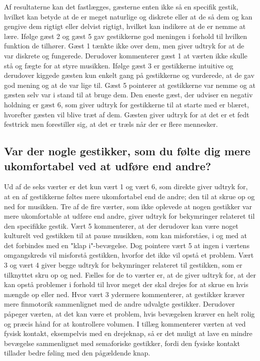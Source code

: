 Af resultaterne kan det fastlægges, gæsterne enten ikke så en specifik gestik, hvilket kan betyde at de er meget naturlige og diskrete eller at de så dem og kan gengive dem rigtigt eller delvist rigtigt, hvilket kan indikere at de er nemme at lære. Ifølge gæst 2 og gæst 5 gav gestikkerne god meningen i forhold til hvilken funktion de tilhører. Gæst 1 tænkte ikke over dem, men giver udtryk for at de var diskrete og fungerede. Derudover kommenterer gæst 1 at værten ikke skulle stå og fægte for at styre musikken. Ifølge gæst 3 er gestikkerne intuitive og derudover kiggede gæsten kun enkelt gang på gestikkerne og vurderede, at de gav god mening og at de var lige til. Gæst 5 pointerer at gestikkerne var nemme og at gæsten selv var i stand til at bruge dem. Den eneste gæst, der udviser en negativ holdning er gæst 6, som giver udtryk for gestikkerne til at starte med er blæret, hvorefter gæsten vil blive træt af dem. Gæsten giver udtryk for at det er et fedt festtrick men forestiller sig, at det er træls når der er flere mennesker.
%
\subsection{Var der nogle gestikker, som du følte dig mere ukomfortabel ved at udføre end andre?}
\label{TestresultaterSocialAcceptGestikkerUkomfortabelt}
%
Ud af de seks værter er det kun vært 1 og vært 6, som direkte giver udtryk for, at en af gestikkerne føltes mere ukomfortabel end de andre; den til at skrue op og ned for musikken. Tre af de fire værter, som ikke oplevede at nogen gestikker var mere ukomfortable at udføre end andre, giver udtryk for bekymringer relateret til den specifikke gestik. Vært 5 kommenterer, at der derudover kan være noget kulturelt ved gestikken til at pause musikken, som kan misforståes, i og med at det forbindes med en "klap i"-bevægelse. Dog pointere vært 5 at ingen i værtens omgangskreds vil misforstå gestikken, hvorfor det ikke vil opstå et problem. Vært 3 og vært 4 giver begge udtryk for bekymringer relateret til gestikken, som er tilknyttet skru op og ned. Fælles for de to værter er, at de giver udtryk for, at der kan opstå problemer i forhold til hvor meget der skal drejes for at skrue en hvis mængde op eller ned. Hvor vært 3 ydermere kommenterer, at gestikker kræver mere finmotorik sammenlignet med de andre udvalgte gestikker. Derudover påpeger værten, at det kan være et problem, hvis bevægelsen kræver en helt rolig og præcis hånd for at kontrollere volumen. I tillæg kommenterer værten at ved fysisk kontakt, eksempelvis med en drejeknap, så er det muligt at lave en mindre bevægelse sammenlignet med semaforiske gestikker, fordi den fysiske kontakt tillader bedre føling med den pågældende knap. 

